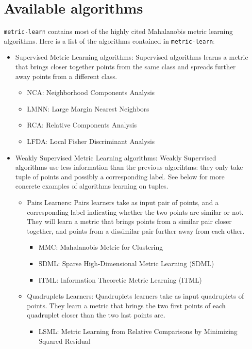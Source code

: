 \documentclass[twoside,11pt]{article}
\begin{document}
\section{Available algorithms}

\texttt{metric-learn} contains most of the highly cited Mahalanobis metric learning algorithms. Here is a list of the algorithms contained in \texttt{metric-learn}:
\begin{itemize}
    \item Supervised Metric Learning algorithms: 
    Supervised algorithms learns a metric that brings closer together points from the same class and spreads further away points from a different class.
    \begin{itemize}
        \item NCA: Neighborhood Components Analysis
        \item LMNN: Large Margin Nearest Neighbors
        \item RCA: Relative Components Analysis
        \item LFDA: Local Fisher Discriminant Analysis
    \end{itemize}
    \item Weakly Supervised Metric Learning algorithms:
    Weakly Supervised algorithms use less information than the previous algorihtms: they only take tuple of points and possibly a corresponding label. See below for more concrete examples of algorithms learning on tuples.
    \begin{itemize}
        \item Pairs Learners: 
        Pairs learners take as input pair of points, and a corresponding label indicating whether the two points are similar or not. They will learn a metric that brings points from a similar pair closer together, and points from a dissimilar pair further away from each other.
        \begin{itemize}
            \item MMC: Mahalanobis Metric for Clustering
            \item SDML: Sparse High-Dimensional Metric Learning (SDML)
            \item ITML: Information Theoretic Metric Learning (ITML)
        \end{itemize}
        \item Quadruplets Learners: 
        Quadruplets learners take as input quadruplets of points. They learn a metric that brings the two first points of each quadruplet closer than the two last points are.
        \begin{itemize}
            \item LSML: Metric Learning from Relative Comparisons by Minimizing Squared Residual
        \end{itemize}
    \end{itemize}
\end{itemize}
\end{document}
